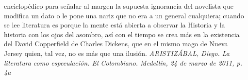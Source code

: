 \documentclass[a4paper,10pt]{article}\usepackage[utf8]{inputenc}\usepackage[spanish]{babel}\usepackage{times}
\begin{document}
enciclopédico para señalar al margen la supuesta ignorancia del novelista que modifica un dato o le pone una nariz que no era a un general cualquiera; cuando se lee literatura es porque la mente está abierta a observar la Historia y la historia con los ojos del asombro, así con el tiempo se crea más en la existencia del David Copperfield de Charles Dickens, que en el mismo mago de Nueva Jersey quien, tal vez, no es más que una ilusión. \newline \textsl{ ARISTIZÁBAL, Diego. La literatura como especulación. El Colombiano. Medellín, 24 de marzo de 2011, p. 4a } \newline
\end{document}
